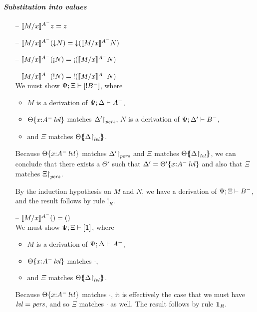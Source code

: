 \paragraph{\it Substitution into values}

\begin{itemize}
\item[--] $\rsubsta{M}{x}{z}{A^-} = z$
\item[--] $\rsubsta{M}{x}{(\tdownr{N})}{A^-}
           = \tdownr{(\rsubsta{M}{x}{N}{A^-})}$
\item[--] $\rsubsta{M}{x}{(\tgnabr{N})}{A^-}
           = \tgnabr{(\rsubsta{M}{x}{N}{A^-})}$
\item[--] $\rsubsta{M}{x}{(\tbangr{N})}{A^-}
           = \tbangr{(\rsubsta{M}{x}{N}{A^-})}$\smallskip\\
  We must show $\foc{\Psi}{\Xi}{[{!}B^-]}$, where 
  \begin{itemize}
  \item $M$ is a derivation of $\foc{\Psi}{\Delta}{A^-}$, 
  \item $\tackon{\Theta}{x{:}\islvl{A^-}}$ matches 
     $\restrictto{\Delta'}{\mpers}$,
     $N$ is a derivation of $\foc{\Psi}{\Delta'}{B^-}$, 
  \item and $\Xi$ matches $\frameoff{\Theta}{\restrictto{\Delta}{\mlvl}}$.
  \end{itemize}
  Because $\tackon{\Theta}{x{:}\islvl{A^-}}$ matches
  $\restrictto{\Delta'}{\mpers}$ and $\Xi$ matches 
  $\frameoff{\Theta}{\restrictto{\Delta}{\mlvl}}$, we can conclude that
  there exists a $\Theta'$ such that
  $\Delta' = \tackon{\Theta'}{x{:}\islvl{A^-}}$ and also that
  $\Xi$ matches $\restrictto{\Xi}{\mpers}$.

  By the induction hypothesis on $M$ and $N$, 
  we have a derivation of $\foc{\Psi}{\Xi}{B^-}$, 
  and the result follows by rule ${!}_R$. 

\smallskip

\item[--] $\rsubsta{M}{x}{\toner}{A^-} = \toner$ \smallskip\\
  We must show $\foc{\Psi}{\Xi}{[\one]}$, where
  \begin{itemize}
  \item $M$ is a derivation of $\foc{\Psi}{\Delta}{A^-}$, 
  \item $\tackon{\Theta}{x{:}\islvl{A^-}}$ matches $\cdot$,
  \item and $\Xi$ matches $\frameoff{\Theta}{\restrictto{\Delta}{\mlvl}}$.
  \end{itemize}
  Because $\tackon{\Theta}{x{:}\islvl{A^-}}$ matches $\cdot$, it is
  effectively the case that we must have $\mlvl = \mpers$, and so 
  $\Xi$ matches $\cdot$ as well. The result follows by rule ${\one}_R$. 


\end{itemize}
